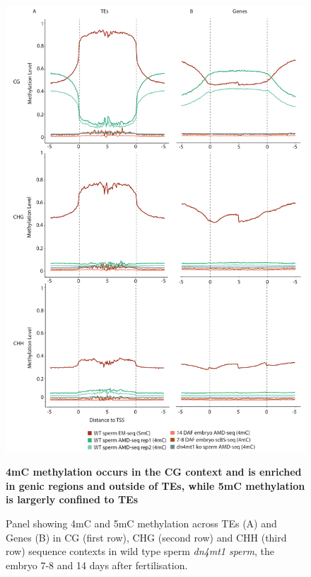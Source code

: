 \begin{figure}[htbp!] 
\centering    
    \includegraphics[width=1\textwidth]{Chapter3/Figs/Figure8_ends_analysis.pdf}
\caption{\textbf{4mC methylation occurs in the CG context and is enriched in genic regions and outside of TEs, while 5mC methylation is largerly confined to TEs}}
\label{fig:ends_analysis}
\captionsetup{font=small}
    \caption*{Panel showing 4mC and 5mC methylation across TEs (A) and Genes (B) in CG (first row), CHG (second row) and CHH (third row) sequence contexts in wild type sperm \textit{dn4mt1 sperm}, the embryo 7-8 and 14 days after fertilisation.}
\end{figure}

